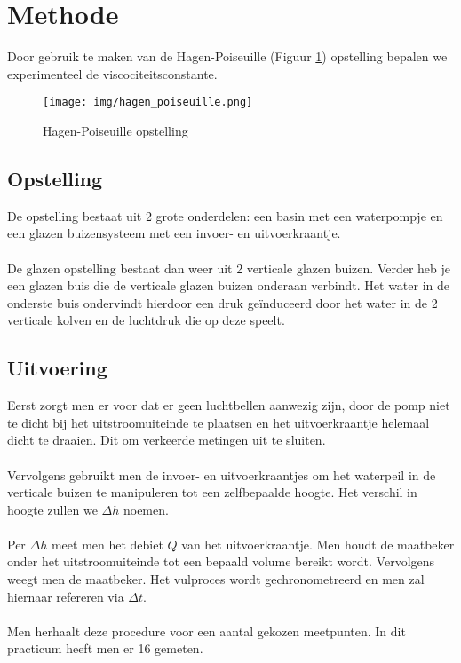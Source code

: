 \section{Methode}

Door gebruik te maken van de Hagen-Poiseuille (Figuur \ref{fig:hagen-pois}) 
opstelling bepalen we experimenteel de viscociteitsconstante. \\

\begin{figure}[h]
    \centering
    \caption{Hagen-Poiseuille opstelling}
    \texttt{[image: img/hagen\_poiseuille.png]}
    \label{fig:hagen-pois}
\end{figure}

\subsection{Opstelling}

De opstelling bestaat uit 2 grote onderdelen: een basin
met een waterpompje en een glazen buizensysteem met
een invoer- en uitvoerkraantje.
\\ \\
De glazen opstelling bestaat dan weer uit 2 verticale 
glazen buizen. Verder heb je een glazen buis
die de verticale glazen buizen onderaan verbindt.
Het water in de onderste buis ondervindt hierdoor een druk
geïnduceerd door het water in de 2 verticale kolven en de
luchtdruk die op deze speelt.

\subsection{Uitvoering}

Eerst zorgt men er voor dat er geen luchtbellen aanwezig zijn, door
de pomp niet te dicht bij het uitstroomuiteinde te plaatsen
en het uitvoerkraantje helemaal dicht te draaien.
Dit om verkeerde metingen uit te sluiten.
\\ \\
Vervolgens gebruikt men de invoer- en uitvoerkraantjes om
het waterpeil in de verticale buizen te manipuleren tot
een zelfbepaalde hoogte. Het verschil in hoogte zullen we
$\Delta h$ noemen.
\\ \\
Per $\Delta h$ meet men het debiet $Q$ van het
uitvoerkraantje. Men houdt de maatbeker onder het uitstroomuiteinde 
tot een bepaald volume bereikt wordt.
Vervolgens weegt men de maatbeker. Het vulproces wordt gechronometreerd
en men zal hiernaar refereren via $\Delta t$.
\\ \\
Men herhaalt deze procedure voor een aantal gekozen meetpunten.
In dit practicum heeft men er 16 gemeten.

